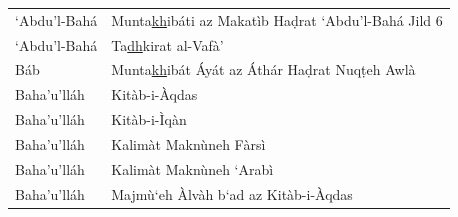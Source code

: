 \documentclass[12pt, oneside]{report}
\begin{document}
\begin{appendix}
\begin{table}[ht]
\begin{tabular}{ll}
	`Abdu'l-Bah\'{a}	& Munta\underline{kh}ib\'{a}ti az Makat\`{i}b Ha\d{d}rat `Abdu'l-Bah\'{a} Jild 6 \\
	`Abdu'l-Bah\'{a}	& Ta\underline{dh}kirat al-Vaf\`{a}' \\
	B\'{a}b & Munta\underline{kh}ib\'{a}t \'{A}y\'{a}t az \'{A}th\'{a}r Ha\d{d}rat Nuq\d{t}eh Awl\`{a} \\
	Baha'u'll\'{a}h & Kit\`{a}b-i-\`{A}qdas \\
	Baha'u'll\'{a}h & Kit\`{a}b-i-\`{I}q\`{a}n \\
	Baha'u'll\'{a}h & Kalim\`{a}t Makn\`{u}neh F\`{a}rs\`{i} \\
	Baha'u'll\'{a}h & Kalim\`{a}t Makn\`{u}neh `Arab\`{i} \\
	Baha'u'll\'{a}h & Majm\`{u}`eh \`{A}lv\`{a}h b`ad az Kit\`{a}b-i-\`{A}qdas \\

	\end{tabular}
\end{table}
\end{appendix}
\singlespacing
\printbibliography
\end{document}
